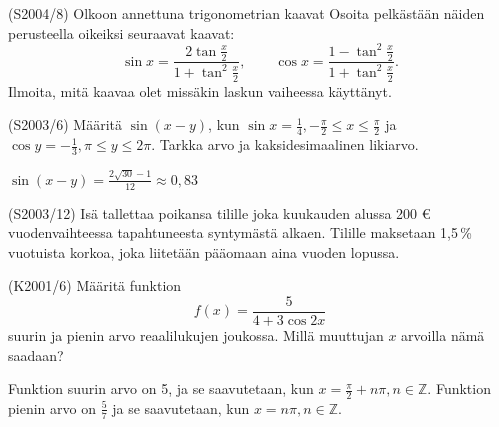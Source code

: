 \begin{tehtava} (S2004/8)
	Olkoon annettuna trigonometrian kaavat 
	Osoita pelkästään näiden perusteella oikeiksi seuraavat kaavat: 
	\[\sin x=\frac{2\tan\frac{x}{2}}{1+\tan^2\frac{x}{2}}, \qquad \cos x=\frac{1-\tan^2\frac{x}{2}}{1+\tan^2\frac{x}{2}}.\]
	Ilmoita, mitä kaavaa olet missäkin laskun vaiheessa käyttänyt.
\end{tehtava}

\begin{tehtava} (S2003/6)
	Määritä $\sin(x-y)$, kun $\sin x=\frac{1}{4}, -\frac{\pi}{2}\leq x \leq \frac{\pi}{2}$ ja $\cos y=-\frac{1}{3}, 
	\pi \leq y \leq 2\pi$. Tarkka arvo ja kaksidesimaalinen likiarvo.
		\begin{vastaus}
			$\sin(x-y)=\frac{2\sqrt{30}-1}{12}\approx0,83$
		\end{vastaus}
\end{tehtava}

\begin{tehtava} (S2003/12)
	Isä tallettaa poikansa tilille joka kuukauden alussa 200 \euro \, vuodenvaihteessa tapahtuneesta syntymästä alkaen.
	Tilille maksetaan 1,5\,\% vuotuista korkoa, joka liitetään pääomaan aina vuoden lopussa.
			\begin{vastaus}
			\end{vastaus}
\end{tehtava}

\begin{tehtava} (K2001/6)
	Määritä funktion \[f(x)=\frac{5}{4+3\cos2x}\] suurin ja pienin arvo reaalilukujen joukossa. Millä muuttujan $x$ 
	arvoilla nämä saadaan?
		\begin{vastaus}
			Funktion suurin arvo on 5, ja se saavutetaan, kun $x=\frac{\pi}{2}+n\pi, n\in\mathbb{Z}$.
			Funktion pienin arvo on $\frac{5}{7}$ ja se saavutetaan, kun $x=n\pi, n\in\mathbb{Z}$.
		\end{vastaus}
\end{tehtava}

